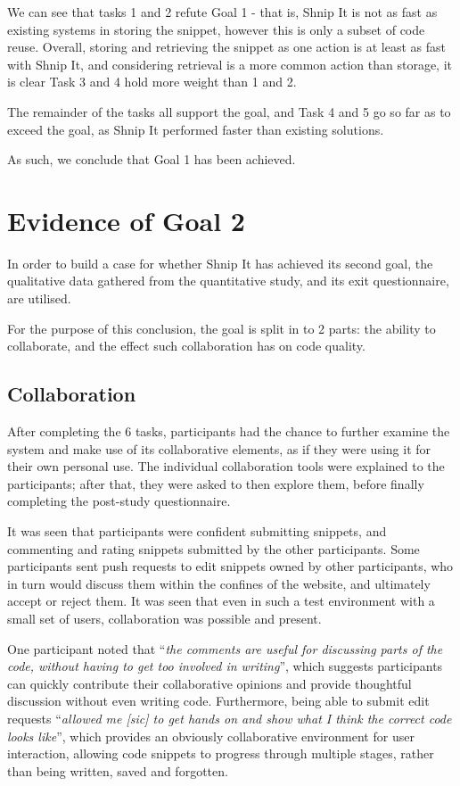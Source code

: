 We can see that tasks 1 and 2 refute Goal 1 - that is, Shnip It is not as fast as existing systems in storing the snippet, however this is only a subset of code reuse.
Overall, storing and retrieving the snippet as one action is at least as fast with Shnip It, and considering retrieval is a more common action than storage, it is clear Task 3 and 4 hold more weight than 1 and 2.

The remainder of the tasks all support the goal, and Task 4 and 5 go so far as to exceed the goal, as Shnip It performed faster than existing solutions.

As such, we conclude that Goal 1 has been achieved.

\section{Evidence of Goal 2}
In order to build a case for whether Shnip It has achieved its second goal, the qualitative data gathered from the quantitative study, and its exit questionnaire, are utilised.

For the purpose of this conclusion, the goal is split in to 2 parts: the ability to collaborate, and the effect such collaboration has on code quality.

\subsection{Collaboration}
After completing the 6 tasks, participants had the chance to further examine the system and make use of its collaborative elements, as if they were using it for their own personal use.
The individual collaboration tools were explained to the participants; after that, they were asked to then explore them, before finally completing the post-study questionnaire.

It was seen that participants were confident submitting snippets, and commenting and rating snippets submitted by the other participants. 
Some participants sent push requests to edit snippets owned by other participants, who in turn would discuss them within the confines of the website, and ultimately accept or reject them.
It was seen that even in such a test environment with a small set of users, collaboration was possible and present.

One participant noted that ``\textit{the comments are useful for discussing parts of the code, without having to get too involved in writing}'', which suggests participants can quickly contribute their collaborative opinions and provide thoughtful discussion without even writing code.
Furthermore, being able to submit edit requests ``\textit{allowed me [sic] to get hands on and show what I think the correct code looks like}'', which provides an obviously collaborative environment for user interaction, allowing code snippets to progress through multiple stages, rather than being written, saved and forgotten.

